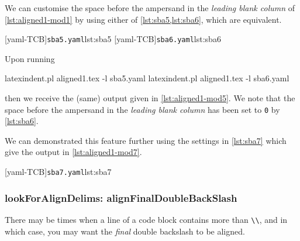  \begin{example}
 We can customise the space before the ampersand in the \emph{leading blank column} of
 \cref{lst:aligned1-mod1} by using either of \cref{lst:sba5,lst:sba6}, which are
 equivalent.

 \begin{cmhtcbraster}
  [yaml-TCB]{\texttt{sba5.yaml}}{lst:sba5}
  [yaml-TCB]{\texttt{sba6.yaml}}{lst:sba6}
 \end{cmhtcbraster}

 Upon running

 \begin{commandshell}
latexindent.pl aligned1.tex -l sba5.yaml
latexindent.pl aligned1.tex -l sba6.yaml
\end{commandshell}

 then we receive the (same) output given in \cref{lst:aligned1-mod5}. We note that the
 space before the ampersand in the \emph{leading blank column} has been set to \texttt{0}
 by \cref{lst:sba6}.

 We can demonstrated this feature further using the settings in \cref{lst:sba7} which
 give the output in \cref{lst:aligned1-mod7}.

 \begin{cmhtcbraster}[raster columns=3,
   raster left skip=-3.75cm,
   raster right skip=-2cm,]
  [yaml-TCB]{\texttt{sba7.yaml}}{lst:sba7}
 \end{cmhtcbraster}
 \end{example}

\subsubsection{lookForAlignDelims: alignFinalDoubleBackSlash}
 There may be times when a line of a code block contains more than \lstinline!\\!, and in
 which case, you may want the \emph{final} double backslash to be aligned.

